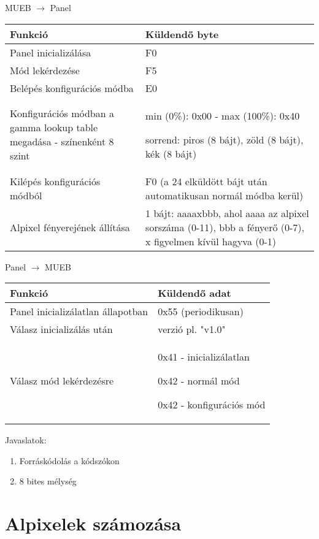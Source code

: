 MUEB $\rightarrow$ Panel
\begin{center}
  \begin{tabularx}{\linewidth}{ L L }
    Funkció & Küldendő byte \\ \hline \hline
    Panel inicializálása & F0 \\ \hline
    Mód lekérdezése & F5 \\ \hline
    Belépés konfigurációs módba & E0\\ \hline
    Konfigurációs módban a gamma lookup table megadása - színenként 8 szint & min (0\%): 0x00 - max (100\%): 0x40 \par
                                                                                                                                sorrend: piros (8 bájt), zöld (8 bájt), kék (8 bájt) \\ \hline
    Kilépés konfigurációs módból & F0 (a 24 elküldött bájt után automatikusan normál módba kerül) \\ \hline
    Alpixel fényerejének állítása & 1 bájt: aaaaxbbb, ahol aaaa az alpixel sorszáma (0-11), bbb a fényerő (0-7), x figyelmen kívül hagyva (0-1) \\ \hline
  \end{tabularx}
\end{center}
\begin{minipage}{\textwidth}
Panel $\rightarrow$ MUEB
\begin{center}
  \begin{tabularx}{\linewidth}{ L L }
    Funkció & Küldendő adat \\ \hline \hline
    Panel inicializálatlan állapotban & 0x55 (periodikusan) \\ \hline
    Válasz inicializálás után & verzió pl. "v1.0" \\ \hline
    Válasz mód lekérdezésre & 0x41 - inicializálatlan \par
                                            0x42 - normál mód \par
                                            0x42 - konfigurációs mód \\ \hline
  \end{tabularx}
\end{center}
\end{minipage}

Javaslatok:
\begin{enumerate}
 \item Forráskódolás a kódszókon
 \item 8 bites mélység
\end{enumerate}

\section{Alpixelek számozása}
